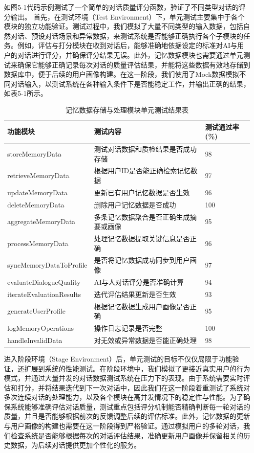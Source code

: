 如图5-1代码示例测试了一个简单的对话质量评分函数，验证了不同类型对话的评分输出。
首先，在测试环境（Test Environment）下，单元测试主要集中于各个模块的独立功能验证。测试过程中，我们模拟了大量不同类型的输入数据，包括自然对话、预设对话场景和异常数据，来测试系统是否能够正确执行各个子模块的任务。例如，评估与打分模块在收到对话后，能够准确地依据设定的标准对AI与用户的对话进行评分，并确保评分结果无误。此外，记忆数据模块也需要通过单元测试来确保它能够正确记录每次对话的质量评估结果，并能将这些数据有效地存储到数据库中，便于后续的用户画像构建。在这一阶段，我们使用了Mock数据模拟不同对话输入，以测试系统在各种输入条件下是否能稳定工作，并输出正确的结果，如表5-1所示。
\begin{table}[htb]
\centering
\caption{记忆数据存储与处理模块单元测试结果表}
\label{tab:unit-test-memory}
{\renewcommand{\arraystretch}{1.2}
\begin{tabular}{p{5cm} p{6cm} p{2cm}}
\hline
功能模块 & 测试内容 & 测试通过率 (\%) \\
\hline
storeMemoryData & 测试对话数据和质检结果是否成功存储 & 98 \\ \hline
retrieveMemoryData & 根据用户ID是否能正确检索记忆数据 & 97 \\ \hline
updateMemoryData & 更新已有用户记忆数据是否生效 & 96 \\ \hline
deleteMemoryData & 删除用户记忆数据是否成功 & 100 \\ \hline
aggregateMemoryData & 多条记忆数据聚合是否正确生成摘要或画像 & 95 \\ \hline
processMemoryData & 处理记忆数据提取关键信息是否正确 & 96 \\ \hline
syncMemoryDataToProfile & 是否将记忆数据成功同步到用户画像 & 97 \\ \hline
evaluateDialogueQuality & AI与人对话评分是否准确计算 & 94 \\ \hline
iterateEvaluationResults & 迭代评估结果更新是否生效 & 93 \\ \hline
generateUserProfile & 根据记忆数据生成用户画像是否正确 & 95 \\ \hline
logMemoryOperations & 操作日志记录是否完整 & 100 \\ \hline
handleInvalidData & 对无效或异常数据是否能正确处理 & 98 \\ 
\hline
\end{tabular}}
\end{table}

进入阶段环境（Stage Environment）后，单元测试的目标不仅仅局限于功能验证，还扩展到系统的性能测试\cite{MOLINA2025112276}。在阶段环境中，我们模拟了更接近真实用户的行为模式，并通过大量并发的对话数据测试系统在压力下的表现。由于系统需要实时评估和打分，并将结果迭代到下一次对话中，因此我们在这一阶段着重测试了系统对多次连续对话的处理能力，以及各个模块在高并发情况下的稳定性与性能。为了确保系统能够准确评估对话质量，测试重点包括评分机制能否精确判断每一轮对话的质量，并且是否能够根据前次的反馈调整后续的评估标准。此外，记忆数据的更新与用户画像的构建也需要在这一阶段得到严格验证。通过模拟用户的多轮对话，我们检查系统是否能够根据每次的对话评估结果，准确更新用户画像并保留相关的历史数据，为后续对话提供更加个性化的服务。

